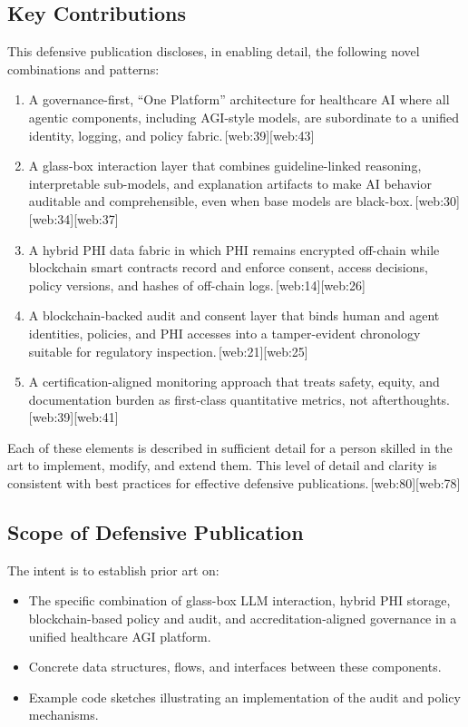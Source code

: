 \documentclass[11pt]{article}
\begin{document}
\subsection{Key Contributions}

This defensive publication discloses, in enabling detail, the following novel combinations and patterns:
\begin{enumerate}[nosep]
  \item A governance-first, ``One Platform'' architecture for healthcare AI where all agentic components, including AGI-style models, are subordinate to a unified identity, logging, and policy fabric.\,[web:39][web:43]
  \item A glass-box interaction layer that combines guideline-linked reasoning, interpretable sub-models, and explanation artifacts to make AI behavior auditable and comprehensible, even when base models are black-box.\,[web:30][web:34][web:37]
  \item A hybrid PHI data fabric in which PHI remains encrypted off-chain while blockchain smart contracts record and enforce consent, access decisions, policy versions, and hashes of off-chain logs.\,[web:14][web:26]
  \item A blockchain-backed audit and consent layer that binds human and agent identities, policies, and PHI accesses into a tamper-evident chronology suitable for regulatory inspection.\,[web:21][web:25]
  \item A certification-aligned monitoring approach that treats safety, equity, and documentation burden as first-class quantitative metrics, not afterthoughts.\,[web:39][web:41]
\end{enumerate}

Each of these elements is described in sufficient detail for a person skilled in the art to implement, modify, and extend them. 
This level of detail and clarity is consistent with best practices for effective defensive publications.\,[web:80][web:78]

\subsection{Scope of Defensive Publication}

The intent is to establish prior art on:
\begin{itemize}[nosep]
  \item The specific combination of glass-box LLM interaction, hybrid PHI storage, blockchain-based policy and audit, and accreditation-aligned governance in a unified healthcare AGI platform.
  \item Concrete data structures, flows, and interfaces between these components.
  \item Example code sketches illustrating an implementation of the audit and policy mechanisms.
\end{itemize}
\end{document}
